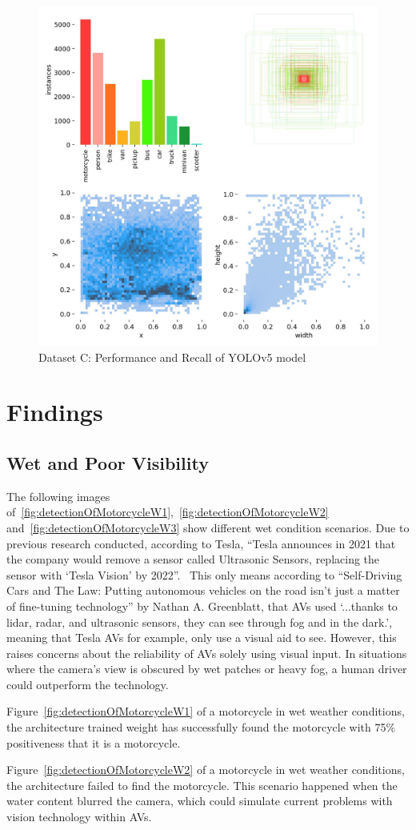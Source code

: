 \documentclass[12pt]{report} %
\begin{document}
		\begin{figure}[hb]
			\centering
			\includegraphics[width=.43\columnwidth]{Figures/dataset_c/labels.jpg}
			\caption{Dataset C: Performance and Recall of YOLOv5 model}
			\label{fig:ntDatasetYolov5MediumWeightLabels}
		\end{figure}

\chapter{Findings}
\label{chap:findings}
	\section{Wet and Poor Visibility}
		The following images of~\ref{fig:detectionOfMotorcycleW1},~\ref{fig:detectionOfMotorcycleW2} and~\ref{fig:detectionOfMotorcycleW3} show different wet condition scenarios. Due to previous research conducted, according to Tesla, ``Tesla announces in 2021 that the company would remove a sensor called Ultrasonic Sensors, replacing the sensor with `Tesla Vision' by 2022''.~\cite{noauthor_tesla_nodate} This only means according to ``Self-Driving Cars and The Law: Putting autonomous vehicles on the road isn't just a matter of fine-tuning technology'' by Nathan A. Greenblatt, that AVs used `...thanks to lidar, radar, and ultrasonic sensors, they can see through fog and in the dark.', meaning that Tesla AVs for example, only use a visual aid to see. However, this raises concerns about the reliability of AVs solely using visual input. In situations where the camera's view is obscured by wet patches or heavy fog, a human driver could outperform the technology.

		Figure~\ref{fig:detectionOfMotorcycleW1} of a motorcycle in wet weather conditions, the architecture trained weight has successfully found the motorcycle with 75\% positiveness that it is a motorcycle.

		Figure~\ref{fig:detectionOfMotorcycleW2} of a motorcycle in wet weather conditions, the architecture failed to find the motorcycle. This scenario happened when the water content blurred the camera, which could simulate current problems with vision technology within AVs.
\end{document}
